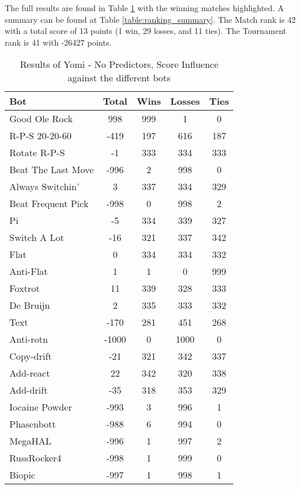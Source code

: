 The full results are found in Table \ref{table:JustYomiWithScoreInfluence_results} with the winning matches highlighted. A summary can be found at Table \ref{table:ranking_summary}. The Match rank is 42 with a total score of 13 points (1 win, 29 losses, and 11 ties). The Tournament rank is 41 with -26427 points.

\begin{table}
    \caption{Results of Yomi - No Predictors, Score Influence against the different bots}
    \label{table:JustYomiWithScoreInfluence_results}
    \centering
    \begin{tabular}{|l|c|c|c|c|}
        \hline
        \textbf{Bot} & \textbf{Total} & \textbf{Wins} & \textbf{Losses} & \textbf{Ties} \\ \hline
\rowcolor{HighlightRowColor} Good Ole Rock & 998 & 999 & 1 & 0 \\ \hline 
R-P-S 20-20-60 & -419 & 197 & 616 & 187 \\ \hline 
Rotate R-P-S & -1 & 333 & 334 & 333 \\ \hline 
Beat The Last Move & -996 & 2 & 998 & 0 \\ \hline 
Always Switchin' & 3 & 337 & 334 & 329 \\ \hline 
Beat Frequent Pick & -998 & 0 & 998 & 2 \\ \hline 
Pi & -5 & 334 & 339 & 327 \\ \hline 
Switch A Lot & -16 & 321 & 337 & 342 \\ \hline 
Flat & 0 & 334 & 334 & 332 \\ \hline 
Anti-Flat & 1 & 1 & 0 & 999 \\ \hline 
Foxtrot & 11 & 339 & 328 & 333 \\ \hline 
De Bruijn & 2 & 335 & 333 & 332 \\ \hline 
Text & -170 & 281 & 451 & 268 \\ \hline 
Anti-rotn & -1000 & 0 & 1000 & 0 \\ \hline 
Copy-drift & -21 & 321 & 342 & 337 \\ \hline 
Add-react & 22 & 342 & 320 & 338 \\ \hline 
Add-drift & -35 & 318 & 353 & 329 \\ \hline 
Iocaine Powder & -993 & 3 & 996 & 1 \\ \hline 
Phasenbott & -988 & 6 & 994 & 0 \\ \hline 
MegaHAL & -996 & 1 & 997 & 2 \\ \hline 
RussRocker4 & -998 & 1 & 999 & 0 \\ \hline 
Biopic & -997 & 1 & 998 & 1 \\ \hline 

\end{tabular}
\end{table}
